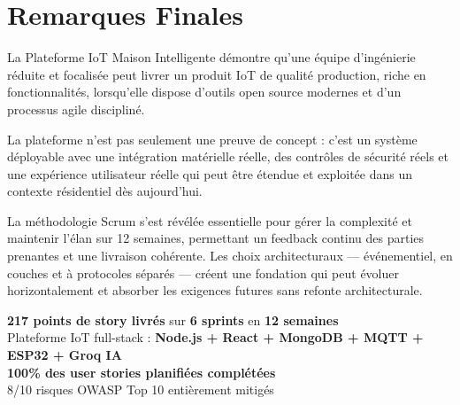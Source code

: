 \section{Remarques Finales}

La Plateforme IoT Maison Intelligente démontre qu'une équipe d'ingénierie réduite et
focalisée peut livrer un produit IoT de qualité production, riche en fonctionnalités,
lorsqu'elle dispose d'outils open source modernes et d'un processus agile discipliné.

La plateforme n'est pas seulement une preuve de concept : c'est un système déployable
avec une intégration matérielle réelle, des contrôles de sécurité réels et une expérience
utilisateur réelle qui peut être étendue et exploitée dans un contexte résidentiel dès
aujourd'hui.

La méthodologie Scrum s'est révélée essentielle pour gérer la complexité et maintenir
l'élan sur 12 semaines, permettant un feedback continu des parties prenantes et une
livraison cohérente. Les choix architecturaux --- événementiel, en couches et à protocoles
séparés --- créent une fondation qui peut évoluer horizontalement et absorber les
exigences futures sans refonte architecturale.

\vspace{1cm}
\begin{tcolorbox}[goalbox,title={Récapitulatif du Projet}]
\centering
\textbf{217 points de story livrés} sur \textbf{6 sprints} en \textbf{12 semaines} \\[0.4cm]
Plateforme IoT full-stack :
\textbf{Node.js + React + MongoDB + MQTT + ESP32 + Groq IA} \\[0.4cm]
\textbf{100\% des user stories planifiées complétées} \\[0.4cm]
8/10 risques OWASP Top 10 entièrement mitigés
\end{tcolorbox}
